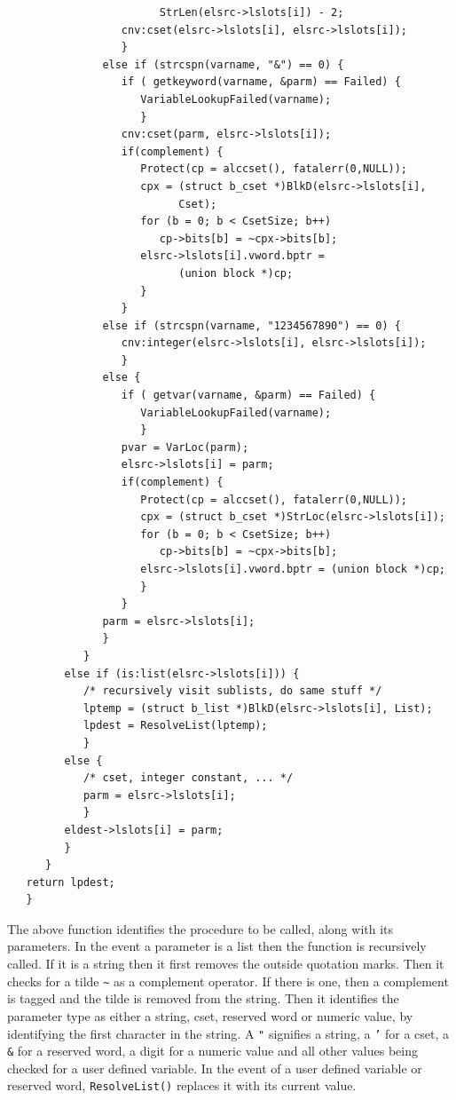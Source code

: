 \documentclass{article}
\begin{document}
\begin{verbatim}
                        StrLen(elsrc->lslots[i]) - 2;
                  cnv:cset(elsrc->lslots[i], elsrc->lslots[i]);
                  }
               else if (strcspn(varname, "&") == 0) {
                  if ( getkeyword(varname, &parm) == Failed) {
                     VariableLookupFailed(varname);
                     }
                  cnv:cset(parm, elsrc->lslots[i]);
                  if(complement) {
                     Protect(cp = alccset(), fatalerr(0,NULL));
                     cpx = (struct b_cset *)BlkD(elsrc->lslots[i], 
                           Cset);
                     for (b = 0; b < CsetSize; b++) 
                        cp->bits[b] = ~cpx->bits[b];
                     elsrc->lslots[i].vword.bptr = 
                           (union block *)cp;
                     }
                  }
               else if (strcspn(varname, "1234567890") == 0) {
                  cnv:integer(elsrc->lslots[i], elsrc->lslots[i]);
                  }
               else {
                  if ( getvar(varname, &parm) == Failed) {
                     VariableLookupFailed(varname);
                     }
                  pvar = VarLoc(parm);
                  elsrc->lslots[i] = parm;
                  if(complement) {
                     Protect(cp = alccset(), fatalerr(0,NULL));
                     cpx = (struct b_cset *)StrLoc(elsrc->lslots[i]);
                     for (b = 0; b < CsetSize; b++) 
                        cp->bits[b] = ~cpx->bits[b];
                     elsrc->lslots[i].vword.bptr = (union block *)cp;
                     }
                  }
               parm = elsrc->lslots[i];
               }
            }
         else if (is:list(elsrc->lslots[i])) {
            /* recursively visit sublists, do same stuff */
            lptemp = (struct b_list *)BlkD(elsrc->lslots[i], List);
            lpdest = ResolveList(lptemp);
            }
         else { 
            /* cset, integer constant, ... */
            parm = elsrc->lslots[i];
            }
         eldest->lslots[i] = parm;
         }
      }
   return lpdest;
   }
\end{verbatim}
The above function identifies the procedure to be called, along with its parameters.  In the event a parameter is a list then the function is recursively called.  If it is a string then it first removes the outside quotation marks.  Then it checks for a tilde \texttt{\~} as a complement operator.  If there is one, then a complement is tagged and the tilde is removed from the string.  Then it identifies the parameter type as either a string, cset, reserved word or numeric value, by identifying the first character in the string.  A \texttt{"} signifies a string, a \texttt{'} for a cset, a \texttt{\&} for a reserved word, a digit for a numeric value and all other values being checked for a user defined variable.  In the event of a user defined variable or reserved word, \texttt{ResolveList()} replaces it with its current value.
\end{document}

